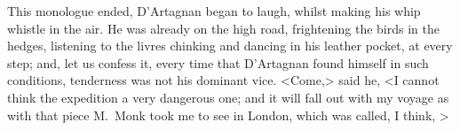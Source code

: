 This monologue ended, D'Artagnan began to laugh, whilst making his whip whistle in the air. He was already on the high road, frightening the birds in the hedges, listening to the livres chinking and dancing in his leather pocket, at every step; and, let us confess it, every time that D'Artagnan found himself in such conditions, tenderness was not his dominant vice. <Come,> said he, <I cannot think the expedition a very dangerous one; and it will fall out with my voyage as with that piece M.~Monk took me to see in London, which was called, I think, > 